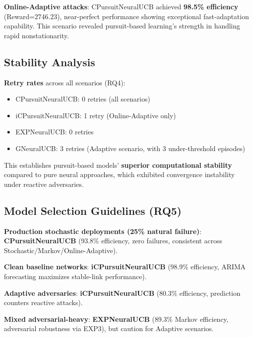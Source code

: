 \documentclass[sigconf,anonymous,review,natbib=false]{acmart}
\begin{document}
\textbf{Online-Adaptive attacks}: CPursuitNeuralUCB achieved \textbf{98.5\% efficiency} (Reward=2746.23), near-perfect performance showing exceptional fast-adaptation capability. This scenario revealed pursuit-based learning's strength in handling rapid nonstationarity.

\subsection{Stability Analysis}

\textbf{Retry rates} across all scenarios (RQ4):
\begin{itemize}[leftmargin=2em]
\item CPursuitNeuralUCB: 0 retries (all scenarios)
\item iCPursuitNeuralUCB: 1 retry (Online-Adaptive only)
\item EXPNeuralUCB: 0 retries
\item GNeuralUCB: 3 retries (Adaptive scenario, with 3 under-threshold episodes)
\end{itemize}

This establishes pursuit-based models' \textbf{superior computational stability} compared to pure neural approaches, which exhibited convergence instability under reactive adversaries.

\subsection{Model Selection Guidelines (RQ5)}

\textbf{Production stochastic deployments (25\% natural failure)}: \textbf{CPursuitNeuralUCB} (93.8\% efficiency, zero failures, consistent across Stochastic/Markov/Online-Adaptive).

\textbf{Clean baseline networks}: \textbf{iCPursuitNeuralUCB} (98.9\% efficiency, ARIMA forecasting maximizes stable-link performance).

\textbf{Adaptive adversaries}: \textbf{iCPursuitNeuralUCB} (80.3\% efficiency, prediction counters reactive attacks).

\textbf{Mixed adversarial-heavy}: \textbf{EXPNeuralUCB} (89.3\% Markov efficiency, adversarial robustness via EXP3), but caution for Adaptive scenarios.
\end{document}
